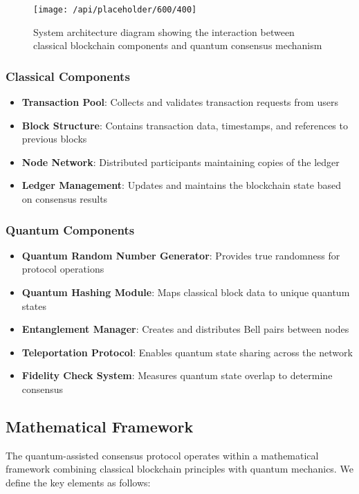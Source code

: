 \documentclass[11pt,a4paper]{article}
\begin{document}
\begin{figure}[H]
\centering
\texttt{[image: /api/placeholder/600/400]}
\caption{System architecture diagram showing the interaction between classical blockchain components and quantum consensus mechanism}
\label{fig:architecture}
\end{figure}

\subsubsection{Classical Components}
\begin{itemize}
    \item \textbf{Transaction Pool}: Collects and validates transaction requests from users
    \item \textbf{Block Structure}: Contains transaction data, timestamps, and references to previous blocks
    \item \textbf{Node Network}: Distributed participants maintaining copies of the ledger
    \item \textbf{Ledger Management}: Updates and maintains the blockchain state based on consensus results
\end{itemize}

\subsubsection{Quantum Components}
\begin{itemize}
    \item \textbf{Quantum Random Number Generator}: Provides true randomness for protocol operations
    \item \textbf{Quantum Hashing Module}: Maps classical block data to unique quantum states
    \item \textbf{Entanglement Manager}: Creates and distributes Bell pairs between nodes
    \item \textbf{Teleportation Protocol}: Enables quantum state sharing across the network
    \item \textbf{Fidelity Check System}: Measures quantum state overlap to determine consensus
\end{itemize}

\subsection{Mathematical Framework}
The quantum-assisted consensus protocol operates within a mathematical framework combining classical blockchain principles with quantum mechanics. We define the key elements as follows:
\end{document}

